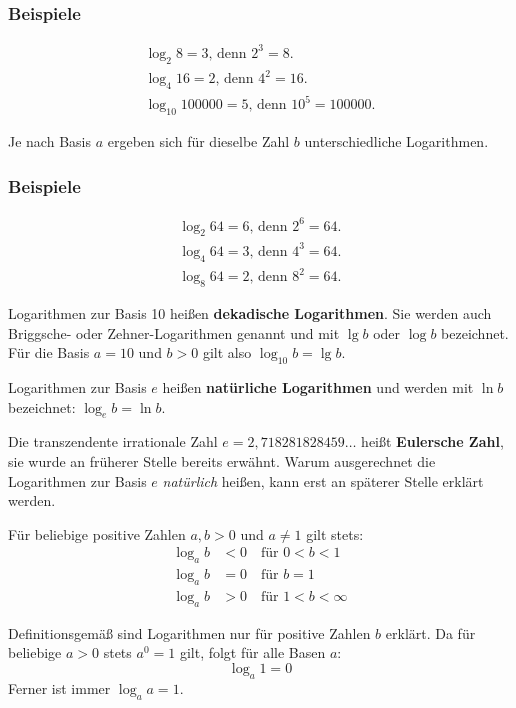 \subsubsection{Beispiele}

\begin{gather*}\log_2 8 = 3 \text{, denn } 2^3 = 8 . \\ \log_4 16 = 2 \text{, denn } 4^2 = 16 . \\ \log_{10} 100000 = 5 \text{, denn } 10^5 = 100000 .\end{gather*}\beispielende

Je nach Basis $a$ ergeben sich für dieselbe Zahl $b$ unterschiedliche Logarithmen.

\subsubsection{Beispiele}

\begin{gather*}\log_2 64 = 6 \text{, denn } 2^6 = 64 . \\ \log_4 64 = 3 \text{, denn } 4^3 = 64 . \\ \log_8 64 = 2 \text{, denn } 8^2 = 64 .\end{gather*}\beispielende

Logarithmen zur Basis 10 heißen \textbf{dekadische Logarithmen}. Sie werden auch Briggsche- oder Zehner-Logarithmen genannt und mit $\lg b$ oder $\log b$ bezeichnet. Für die Basis $a = 10$ und $b > 0$ gilt also $\log_{10} b = \lg b$.

Logarithmen zur Basis $e$ heißen \textbf{natürliche Logarithmen} und werden mit $\ln b$ bezeichnet: $\log_e b = \ln b$.

Die transzendente irrationale Zahl $e = 2{,}718281828459\ldots$ heißt \textbf{Eulersche Zahl}, sie wurde an früherer Stelle bereits erwähnt. Warum ausgerechnet die Logarithmen zur Basis $e$ \emph{natürlich} heißen, kann erst an späterer Stelle erklärt werden.

Für beliebige positive Zahlen $a, b > 0$ und $a \neq 1$ gilt stets:
\begin{align*}
  \log_a b &< 0 \quad \text{für } 0 < b < 1\\
  \log_a b &= 0 \quad \text{für } b = 1\\
  \log_a b &> 0 \quad \text{für } 1 < b < \infty
\end{align*}

Definitionsgemäß sind Logarithmen nur für positive Zahlen $b$ erklärt. Da für beliebige $a > 0$ stets $a^0 = 1$ gilt, folgt für alle Basen $a$:
\[ \log_a 1 = 0 \]
Ferner ist immer $\log_a a = 1$.

